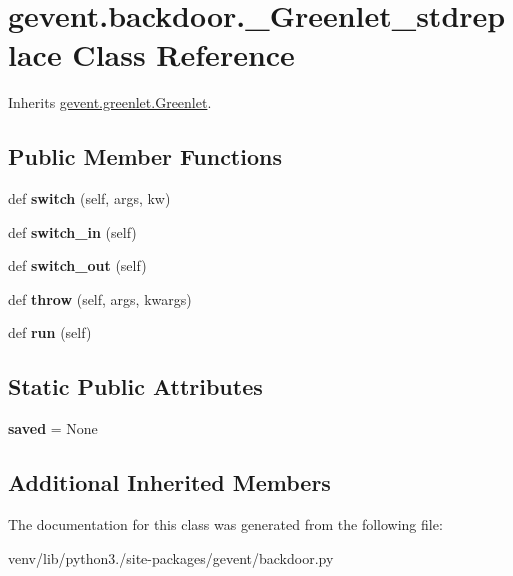 \hypertarget{classgevent_1_1backdoor_1_1___greenlet__stdreplace}{}\section{gevent.\+backdoor.\+\_\+\+Greenlet\+\_\+stdreplace Class Reference}
\label{classgevent_1_1backdoor_1_1___greenlet__stdreplace}


Inherits \hyperlink{classgevent_1_1greenlet_1_1_greenlet}{gevent.\+greenlet.\+Greenlet}.

\subsection*{Public Member Functions}
\begin{DoxyCompactItemize}
\item 
\mbox{\label{classgevent_1_1backdoor_1_1___greenlet__stdreplace_a4038d6681d554af64188540ce1e658fc}} 
def {\bfseries switch} (self, args, kw)
\item 
\mbox{\label{classgevent_1_1backdoor_1_1___greenlet__stdreplace_a0a62ebbcdf1111e0d21145bc5b871751}} 
def {\bfseries switch\+\_\+in} (self)
\item 
\mbox{\label{classgevent_1_1backdoor_1_1___greenlet__stdreplace_a851e326b447671c325388a15c43d2ab5}} 
def {\bfseries switch\+\_\+out} (self)
\item 
\mbox{\label{classgevent_1_1backdoor_1_1___greenlet__stdreplace_a75ecc0d0b77911f01fa8838a87335510}} 
def {\bfseries throw} (self, args, kwargs)
\item 
\mbox{\label{classgevent_1_1backdoor_1_1___greenlet__stdreplace_a30836d7bb240e561db0523658eb771c3}} 
def {\bfseries run} (self)
\end{DoxyCompactItemize}
\subsection*{Static Public Attributes}
\begin{DoxyCompactItemize}
\item 
\mbox{\label{classgevent_1_1backdoor_1_1___greenlet__stdreplace_aa0e06c7bf3a5344bb9cbafb093ed3aa4}} 
{\bfseries saved} = None
\end{DoxyCompactItemize}
\subsection*{Additional Inherited Members}


The documentation for this class was generated from the following file\+:\begin{DoxyCompactItemize}
\item 
venv/lib/python3./site-\/packages/gevent/backdoor.\+py\end{DoxyCompactItemize}
